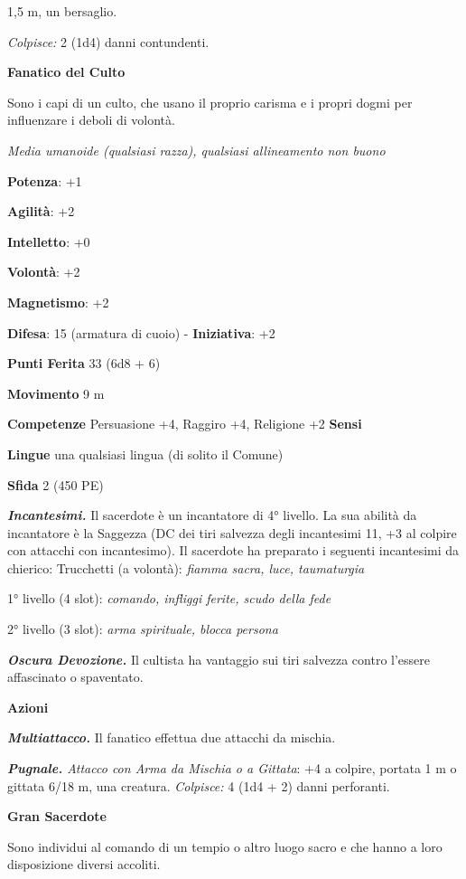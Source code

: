 \begin{multicols}{2}
1,5 m, un bersaglio.

\emph{Colpisce:} 2 (1d4) danni contundenti.


\textbf{Fanatico del Culto}

Sono i capi di un culto, che usano il proprio carisma e i propri dogmi
per influenzare i deboli di volontà.

\emph{Media umanoide (qualsiasi razza), qualsiasi allineamento non
buono}

\textbf{Potenza}: +1

\textbf{Agilità}: +2

\textbf{Intelletto}: +0

\textbf{Volontà}: +2

\textbf{Magnetismo}: +2

\textbf{Difesa}: 15 (armatura di cuoio) - \textbf{Iniziativa}: +2

\textbf{Punti Ferita} 33 (6d8 + 6)

\textbf{Movimento} 9 m

\textbf{Competenze} Persuasione +4, Raggiro +4, Religione +2 \textbf{Sensi}


\textbf{Lingue} una qualsiasi lingua (di solito il Comune)

\textbf{Sfida} 2 (450 PE)\smallskip

\emph{\textbf{Incantesimi.}} Il sacerdote è un incantatore di 4°
livello. La sua abilità da incantatore è la Saggezza (DC dei tiri
salvezza degli incantesimi 11, +3 al colpire con attacchi con
incantesimo). Il sacerdote ha preparato i seguenti incantesimi da
chierico: Trucchetti (a volontà): \emph{fiamma sacra, luce, taumaturgia}

1° livello (4 slot): \emph{comando, infliggi ferite, scudo della fede}

2° livello (3 slot): \emph{arma spirituale, blocca persona}

\emph{\textbf{Oscura Devozione.}} Il cultista ha vantaggio sui tiri
salvezza contro l'essere affascinato o spaventato.

\smallskip\textbf{Azioni}

\emph{\textbf{Multiattacco.}} Il fanatico effettua due attacchi da
mischia.

\emph{\textbf{Pugnale.} Attacco con Arma da Mischia o a Gittata}: +4 a
colpire, portata 1 m o gittata 6/18 m, una creatura. \emph{Colpisce:}
4 (1d4 + 2) danni perforanti.

\textbf{Gran Sacerdote}

Sono individui al comando di un tempio o altro luogo sacro e che hanno a
loro disposizione diversi accoliti.


\end{multicols}

